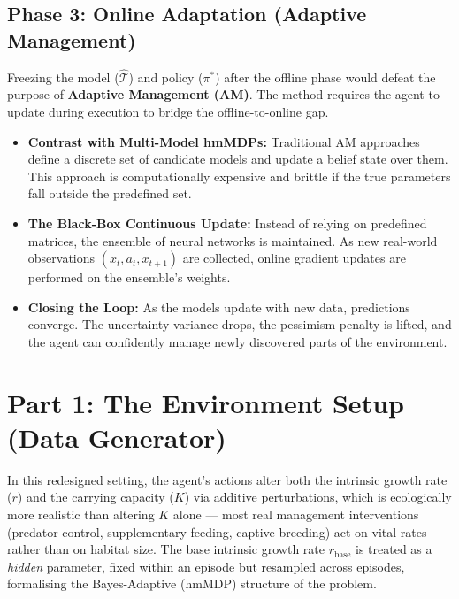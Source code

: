 \documentclass[11pt]{article}
\begin{document}
\subsection{Phase 3: Online Adaptation (Adaptive Management)}
Freezing the model ($\hat{\mathcal{T}}$) and policy ($\pi^*$) after the offline phase would defeat the purpose of \textbf{Adaptive Management (AM)}. The method requires the agent to update during execution to bridge the offline-to-online gap.

\begin{itemize}
    \item \textbf{Contrast with Multi-Model hmMDPs:} Traditional AM approaches define a discrete set of candidate models and update a belief state over them. This approach is computationally expensive and brittle if the true parameters fall outside the predefined set.
    \item \textbf{The Black-Box Continuous Update:} Instead of relying on predefined matrices, the ensemble of neural networks is maintained. As new real-world observations $(x_t, a_t, x_{t+1})$ are collected, online gradient updates are performed on the ensemble's weights. 
    \item \textbf{Closing the Loop:} As the models update with new data, predictions converge. The uncertainty variance drops, the pessimism penalty is lifted, and the agent can confidently manage newly discovered parts of the environment.
\end{itemize}

\newpage
\section*{Part 1: The Environment Setup (Data Generator)}

In this redesigned setting, the agent's actions alter both the intrinsic growth rate ($r$) and the carrying capacity ($K$) via additive perturbations, which is ecologically more realistic than altering $K$ alone --- most real management interventions (predator control, supplementary feeding, captive breeding) act on vital rates rather than on habitat size. The base intrinsic growth rate $r_{\mathrm{base}}$ is treated as a \emph{hidden} parameter, fixed within an episode but resampled across episodes, formalising the Bayes-Adaptive (hmMDP) structure of the problem.
\end{document}
